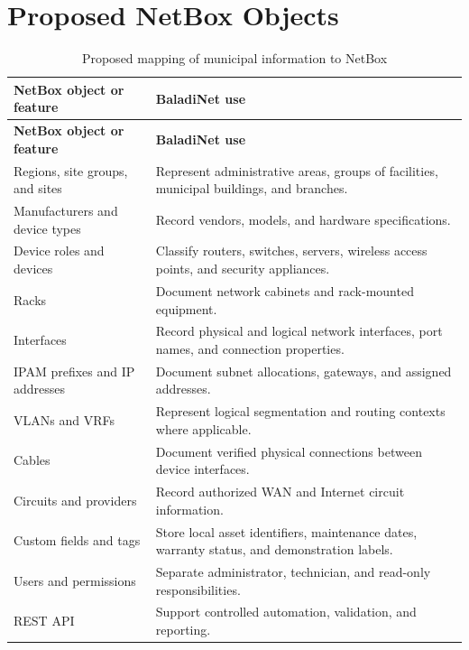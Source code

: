 \documentclass[11pt,a4paper,oneside]{report}
\begin{document}
\section{Proposed NetBox Objects}
\begin{longtable}{L{0.30\textwidth}L{0.62\textwidth}}
\caption{Proposed mapping of municipal information to NetBox}\\
\toprule
\textbf{NetBox object or feature} & \textbf{BaladiNet use}\\
\midrule
\endfirsthead
\toprule
\textbf{NetBox object or feature} & \textbf{BaladiNet use}\\
\midrule
\endhead
Regions, site groups, and sites & Represent administrative areas, groups of facilities, municipal buildings, and branches.\\
Manufacturers and device types & Record vendors, models, and hardware specifications.\\
Device roles and devices & Classify routers, switches, servers, wireless access points, and security appliances.\\
Racks & Document network cabinets and rack-mounted equipment.\\
Interfaces & Record physical and logical network interfaces, port names, and connection properties.\\
IPAM prefixes and IP addresses & Document subnet allocations, gateways, and assigned addresses.\\
VLANs and VRFs & Represent logical segmentation and routing contexts where applicable.\\
Cables & Document verified physical connections between device interfaces.\\
Circuits and providers & Record authorized WAN and Internet circuit information.\\
Custom fields and tags & Store local asset identifiers, maintenance dates, warranty status, and demonstration labels.\\
Users and permissions & Separate administrator, technician, and read-only responsibilities.\\
REST API & Support controlled automation, validation, and reporting.\\
\bottomrule
\end{longtable}
\end{document}
